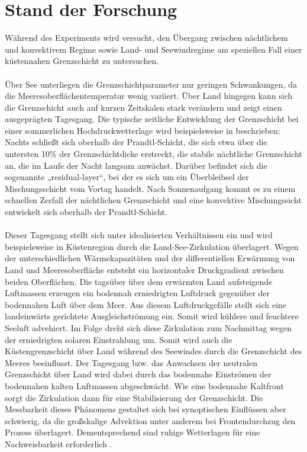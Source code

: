 \documentclass[a4paper,11pt,DIV=calc,tablecaptionabove,headinclude,twoside]{article}
\begin{document}
\section{Stand der Forschung}
Während des Experiments wird versucht, den Übergang zwischen nächtlichem und konvektivem Regime sowie Land- und Seewindregime am speziellen Fall einer küstennahen Grenzschicht zu untersuchen. \\\\
Über See unterliegen die Grenzschichtparameter nur geringen Schwankungen, da die Meeresoberflächentemperatur wenig variiert. Über Land hingegen kann sich die Grenzschicht auch auf kurzen Zeitskalen stark verändern und zeigt einen ausgeprägten Tagesgang. Die typische zeitliche Entwicklung der Grenzschicht bei einer sommerlichen Hochdruckwetterlage wird beispielsweise in \cite{stull1988introduction} beschrieben: Nachts schließt sich oberhalb der Prandtl-Schicht, die sich etwa über die untersten 10\% der Grenzschichtdicke erstreckt, die stabile nächtliche Grenzschicht an, die im Laufe der Nacht langsam anwächst. Darüber befindet sich die sogenannte „residual-layer“, bei der es sich um ein Überbleibsel der Mischungsschicht vom Vortag handelt. Nach Sonnenaufgang kommt es zu einem schnellen Zerfall der nächtlichen Grenzschicht und eine konvektive Mischungssicht entwickelt sich oberhalb der Prandtl-Schicht. \\\\
Dieser Tagesgang stellt sich unter idealisierten Verhältnissen ein und wird beispielsweise in Küstenregion durch die Land-See-Zirkulation überlagert. Wegen der unterschiedlichen Wärmekapazitäten und der differentiellen Erwärmung von Land und Meeresoberfläche entsteht ein horizontaler Druckgradient zwischen beiden Oberflächen. Die tagsüber über dem erwärmten Land aufsteigende Luftmassen erzeugen ein bodennah erniedrigten Luftdruck gegenüber der bodennahen Luft über dem Meer.  
Aus diesem Luftdruckgefälle stellt sich eine landeinwärts gerichtete Ausgleichströmung ein. Somit wird kühlere und feuchtere Seeluft advehiert. Im Folge dreht sich diese Zirkulation zum Nachmittag wegen der erniedrigten solaren Einstrahlung um. Somit wird auch die Küstengrenzschicht über Land während des Seewindes durch die Grenzschicht des Meeres beeinflusst. Der Tagesgang bzw. das Anwachsen der neutralen Grenzschicht über Land wird dabei durch das bodennahe Einströmen der bodennahen kalten Luftmassen abgeschwächt. Wie eine bodennahe Kaltfront sorgt die Zirkulation dann für eine Stabilisierung der Grenzschicht. Die Messbarkeit dieses Phänomens gestaltet sich bei synoptischen Einflüssen aber schwierig, da die großskalige Advektion unter anderem bei Frontendurchzug den Prozess überlagert. Dementsprechend sind ruhige Wetterlagen für eine Nachweisbarkeit erforderlich \citep{Lange2004}.\\\\
\end{document}
